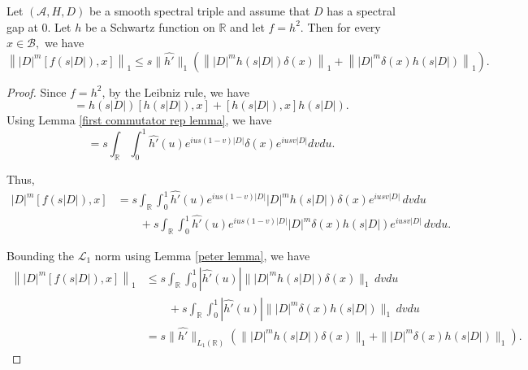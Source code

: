     \begin{lem}\label{second commutator lemma} 
        Let $(\mathcal{A},H,D)$ be a smooth spectral triple and assume that $D$ has a spectral gap at $0$. Let $h$ be a Schwartz function on $\mathbb{R}$ and let $f=h^2.$ Then for every $x\in\mathcal{B},$ we have
        \begin{equation*}
            \left\||D|^m[f(s|D|),x]\right\|_1 \leq s\|\widehat{h'}\|_1\left(\left\||D|^mh(s|D|)\delta(x)\right\|_1+\left\||D|^m\delta(x)h(s|D|)\right\|_1\right).
        \end{equation*}
    \end{lem}
    \begin{proof} 
        Since $f = h^2$, by the Leibniz rule, we have
        \begin{equation*}
            [f(s|D|),x] = h(s|D|)[h(s|D|),x]+[h(s|D|),x]h(s|D|).
        \end{equation*}
        Using Lemma \ref{first commutator rep lemma}, we have
        \begin{equation*}
            [h(s|D|),x] = s\int_{\mathbb{R}} \int_0^1 \widehat{h'}(u)e^{ius(1-v)|D|}\delta(x)e^{iusv|D|}dvdu.
        \end{equation*}
        
        Thus,
        \begin{align*}
            |D|^m[f(s|D|),x] &= s\int_{\mathbb{R}} \int_0^1 \widehat{h'}(u)e^{ius(1-v)|D|}|D|^mh(s|D|)\delta(x)e^{iusv|D|}\,dvdu\\
                             &\quad\quad +s\int_{\mathbb{R}} \int_0^1 \widehat{h'}(u)e^{ius(1-v)|D|}|D|^m\delta(x)h(s|D|)e^{iusv|D|}\,dvdu.
        \end{align*}
        
        Bounding the $\mathcal{L}_1$ norm using Lemma \ref{peter lemma}, we have
        \begin{align*}
            \left\||D|^m[f(s|D|),x]\right\|_1 &\leq s\int_{\mathbb{R}}\int_0^1 |\widehat{h'}(u)|\||D|^mh(s|D|)\delta(x)\|_1\,dvdu\\
                                              &\quad\quad + s\int_\mathbb{R} \int_0^1 |\widehat{h'}(u)|\||D|^m\delta(x)h(s|D|)\|_1\,dvdu\\
                                              &= s\|\widehat{h'}\|_{L_1(\mathbb{R})}(\||D|^mh(s|D|)\delta(x)\|_1+\||D|^m\delta(x)h(s|D|)\|_1).
        \end{align*}
    \end{proof}
    
